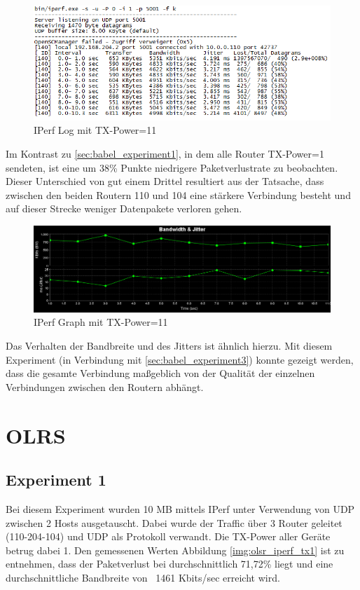 \documentclass[10pt]{scrartcl}
\begin{document}
	\begin{figure}
        \centering
                \includegraphics[width=\textwidth]{img/Babel_TX11_Protokoll}
        \caption{IPerf Log mit TX-Power=11}
        \label{img:babel_iperf_tx11}
	\end{figure}
	
Im Kontrast zu \ref{sec:babel_experiment1}, in dem alle Router TX-Power=1 sendeten, ist eine um 38\% Punkte niedrigere Paketverlustrate zu beobachten. Dieser Unterschied von gut einem Drittel resultiert aus der Tatsache, dass zwischen den beiden Routern 110 und 104 eine stärkere Verbindung besteht und auf dieser Strecke weniger Datenpakete verloren gehen.

	\begin{figure}
        \centering
                \includegraphics[width=\textwidth]{img/4_UDP_Babel_TX1_10MB}
        \caption{IPerf Graph mit TX-Power=11}
        \label{img:babel_iperf_graph_tx11}
	\end{figure}
	
Das Verhalten der Bandbreite und des Jitters ist ähnlich hierzu.
Mit diesem Experiment (in Verbindung mit \ref{sec:babel_experiment3}) konnte gezeigt werden, dass die gesamte Verbindung maßgeblich von der Qualität der einzelnen Verbindungen zwischen den Routern abhängt.

\section{OLRS}
	\subsection{Experiment 1}
	Bei diesem Experiment wurden 10 MB mittels IPerf  unter Verwendung von UDP zwischen 2 Hosts ausgetauscht. Dabei wurde der Traffic über 3 Router geleitet (110-204-104) und UDP als Protokoll verwandt. Die TX-Power aller Geräte betrug dabei 1. 
Den gemessenen Werten Abbildung \ref{img:olsr_iperf_tx1} ist zu entnehmen, dass der Paketverlust bei durchschnittlich 71,72\% liegt und eine durchschnittliche Bandbreite von ~1461 Kbits/sec erreicht wird.
\end{document}
